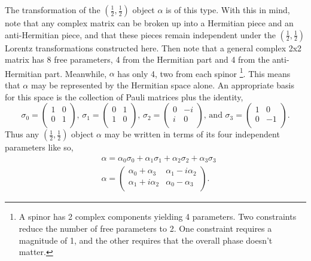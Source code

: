 The transformation of the $(\frac{1}{2}, \frac{1}{2})$ object $\alpha$ is of this type. With this in mind, note that any complex matrix can be broken up into a Hermitian piece and an anti-Hermitian piece, and that these pieces remain independent under the $(\frac{1}{2}, \frac{1}{2})$ Lorentz transformations constructed here. Then note that a general complex 2x2 matrix has 8 free parameters, 4 from the Hermitian part and 4 from the anti-Hermitian part. Meanwhile, $\alpha$ has only 4, two from each spinor \footnote{A spinor has 2 complex components yielding 4 parameters. Two constraints reduce the number of free parameters to 2. One constraint requires a magnitude of 1, and the other requires that the overall phase doesn't matter.}. This means that $\alpha$ may be represented by the Hermitian space alone. An appropriate basis for this space is the collection of Pauli matrices plus the identity,
\begin{equation}
\sigma_0 =  
\begin{pmatrix}
1 & 0 \\
0 & 1 \\
\end{pmatrix}\text{, }
\sigma_1 =  
\begin{pmatrix}
0 & 1 \\
1 & 0 \\
\end{pmatrix}\text{, }
\sigma_2 = 
\begin{pmatrix}
0 & -i \\
i & 0 \\
\end{pmatrix}\text{, and }
\sigma_3 = 
\begin{pmatrix}
1 & 0 \\
0 & -1 \\
\end{pmatrix}.
\end{equation}
Thus any $(\frac{1}{2}, \frac{1}{2})$ object $\alpha$ may be written in terms of its four independent parameters like so, 
\begin{equation}
\begin{split}
&\alpha = \alpha_0 \sigma_0 + \alpha_1 \sigma_1 + \alpha_2 \sigma_2 + \alpha_3 \sigma_3 \\
&\alpha = 
\begin{pmatrix}
\alpha_0 + \alpha_3 & \alpha_1 - i\alpha_2 \\
\alpha_1 + i\alpha_2 & \alpha_0 - \alpha_3 \\
\end{pmatrix}.
\end{split}
\end{equation}

